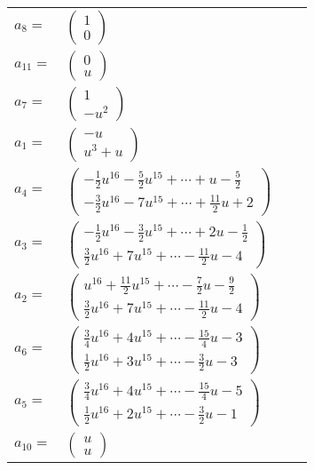 \documentclass[1p]{elsarticle_modified}
\theoremstyle{definition}
\begin{document}
\begin{tabular}{m{7pt} m{180pt} m{7pt} m{180pt} }
\flushright $a_{8}=$&$\begin{pmatrix}1\\0\end{pmatrix}$ \\
\flushright $a_{11}=$&$\begin{pmatrix}0\\u\end{pmatrix}$ \\
\flushright $a_{7}=$&$\begin{pmatrix}1\\- u^2\end{pmatrix}$ \\
\flushright $a_{1}=$&$\begin{pmatrix}- u\\u^3+u\end{pmatrix}$ \\
\flushright $a_{4}=$&$\begin{pmatrix}-\frac{1}{2} u^{16}-\frac{5}{2} u^{15}+\cdots+u-\frac{5}{2}\\-\frac{3}{2} u^{16}-7 u^{15}+\cdots+\frac{11}{2} u+2\end{pmatrix}$ \\
\flushright $a_{3}=$&$\begin{pmatrix}-\frac{1}{2} u^{16}-\frac{3}{2} u^{15}+\cdots+2 u-\frac{1}{2}\\\frac{3}{2} u^{16}+7 u^{15}+\cdots-\frac{11}{2} u-4\end{pmatrix}$ \\
\flushright $a_{2}=$&$\begin{pmatrix}u^{16}+\frac{11}{2} u^{15}+\cdots-\frac{7}{2} u-\frac{9}{2}\\\frac{3}{2} u^{16}+7 u^{15}+\cdots-\frac{11}{2} u-4\end{pmatrix}$ \\
\flushright $a_{6}=$&$\begin{pmatrix}\frac{3}{4} u^{16}+4 u^{15}+\cdots-\frac{15}{4} u-3\\\frac{1}{2} u^{16}+3 u^{15}+\cdots-\frac{3}{2} u-3\end{pmatrix}$ \\
\flushright $a_{5}=$&$\begin{pmatrix}\frac{3}{4} u^{16}+4 u^{15}+\cdots-\frac{15}{4} u-5\\\frac{1}{2} u^{16}+2 u^{15}+\cdots-\frac{3}{2} u-1\end{pmatrix}$ \\
\flushright $a_{10}=$&$\begin{pmatrix}u\\u\end{pmatrix}$ \\

\end{tabular}
\end{document}
